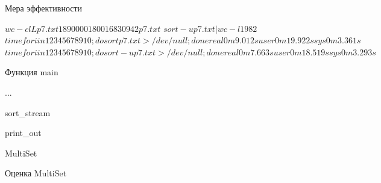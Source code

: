 \documentclass[unknownkeysallowed,xcolor=table]{beamer}
\makeatletter
\newcommand{\srcbigsize}{\@setfontsize{\srcbigsize}{8pt}{8pt}}
\makeatother
\begin{document}
\begin{frame}[fragile]{Мера эффективности}

\begin{cmdline}
$ wc -clL p7.txt
  1890000 180016830       942 p7.txt
$
$ sort -u p7.txt | wc -l
1982
$
$ time for i in 1 2 3 4 5 6 7 8 9 10; do sort p7.txt > /dev/null; done
real	0m9.012s
user	0m19.922s
sys	0m3.361s
$
$ time for i in 1 2 3 4 5 6 7 8 9 10; do sort -u p7.txt > /dev/null; done

real	0m7.663s
user	0m18.519s
sys	0m3.293s
$
\end{cmdline}

\end{frame}

\begin{frame}[fragile]{Функция main}


...


\end{frame}

\begin{frame}[fragile]{sort\_stream}



\end{frame}

\begin{frame}[fragile]{print\_out}



\end{frame}

\begin{frame}[fragile]{MultiSet}



\end{frame}

\begin{frame}[fragile]{Оценка MultiSet}


\end{frame}
\end{document}
